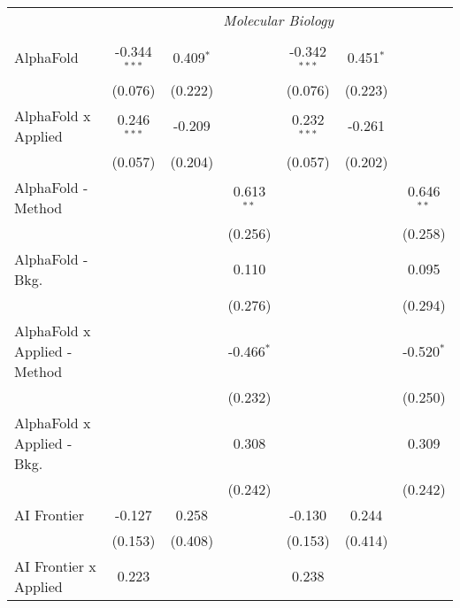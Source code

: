 \begin{tabular}{lcccccc}
 & \multicolumn{6}{c}{\textit{Molecular Biology}} \\ \\
   AlphaFold                    & -0.344$^{***}$ & 0.409$^{*}$   &               & -0.342$^{***}$ & 0.451$^{*}$   &   \\   
                                & (0.076)        & (0.222)       &               & (0.076)        & (0.223)       &   \\   
   AlphaFold x Applied          & 0.246$^{***}$  & -0.209        &               & 0.232$^{***}$  & -0.261        &   \\   
                                & (0.057)        & (0.204)       &               & (0.057)        & (0.202)       &   \\   
   AlphaFold - Method           &                &               & 0.613$^{**}$  &                &               & 0.646$^{**}$\\   
                                &                &               & (0.256)       &                &               & (0.258)\\   
   AlphaFold - Bkg.             &                &               & 0.110         &                &               & 0.095\\   
                                &                &               & (0.276)       &                &               & (0.294)\\   
   AlphaFold x Applied - Method &                &               & -0.466$^{*}$  &                &               & -0.520$^{*}$\\   
                                &                &               & (0.232)       &                &               & (0.250)\\   
   AlphaFold x Applied - Bkg.   &                &               & 0.308         &                &               & 0.309\\   
                                &                &               & (0.242)       &                &               & (0.242)\\   
   AI Frontier                  & -0.127         & 0.258         &               & -0.130         & 0.244         &   \\   
                                & (0.153)        & (0.408)       &               & (0.153)        & (0.414)       &   \\   
   AI Frontier x Applied        & 0.223          &               &               & 0.238          &               &   \\   

\end{tabular}

